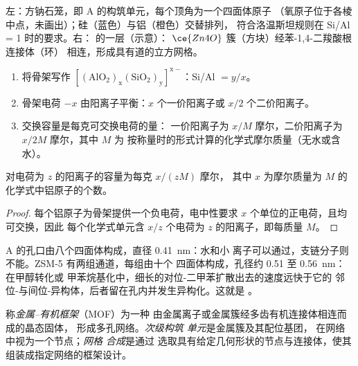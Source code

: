 \begin{omfigure}
{\small 左：方钠石笼，即 A 的构筑单元，每个顶角为一个四面体原子
（氧原子位于各棱中点，未画出）；硅（蓝色）与铝（橙色）交替排列，
符合洛温斯坦规则在 Si/Al = 1 时的要求。右：
的一层（示意）：
$\ce{Zn4O}$ 簇（方块）经苯-1,4-二羧酸根连接体（环）
相连，形成具有道的立方网格。}
\end{omfigure}

\begin{method}[沸石的化学式与交换容量]\label{met:b3:inorganic-materials:zeolite-formula}
\begin{enumerate}
  \item 将骨架写作 $\mathrm{[(AlO_2)_x(SiO_2)_y]^{x-}}$：Si/Al $= y/x$。
  \item 骨架电荷 $-x$ 由阳离子平衡：$x$ 个一价阳离子或 $x/2$
        个二价阳离子。
  \item 交换容量是每克可交换电荷的量：
        一价阳离子为 $x/M$ 摩尔，二价阳离子为 $x/2M$ 摩尔，其中 $M$ 为
        按称量时的形式计算的化学式摩尔质量（无水或含水）。
\end{enumerate}
\end{method}

\begin{proposition}[交换容量]\label{prop:b3:inorganic-materials:exchange-capacity}
对电荷为 $z$ 的阳离子的容量为每克 $x/(zM)$ 摩尔，
其中 $x$ 为摩尔质量为 $M$ 的化学式中铝原子的个数。
\end{proposition}

\begin{proof}
每个铝原子为骨架提供一个负电荷，电中性要求
$x$ 个单位的正电荷，且均可交换，因此
每个化学式单元含 $x/z$ 个电荷为 $z$ 的阳离子，即每质量 $M$。
\end{proof}

 A 的孔口由八个四面体构成，直径 \qty{0.41}{nm}：水和小
离子可以通过，支链分子则不能。ZSM-5 有两组通道，每组由十个
四面体构成，孔径约 0.51 至 \qty{0.56}{nm}：在甲醇转化或
甲苯烷基化中，细长的对位-二甲苯扩散出去的速度远快于它的
邻位-与间位-异构体，后者留在孔内并发生异构化。这就是
。

\begin{definition}[金属–有机框架]\label{def:b3:inorganic-materials:mof}
称\emph{金属–有机框架}（MOF）为一种
由金属离子或金属簇经多齿有机连接体相连而成的晶态固体，
形成多孔网络。\emph{次级构筑
单元}是金属簇及其配位基团，
在网络中视为一个节点；\emph{网格
合成}是通过
选取具有给定几何形状的节点与连接体，使其组装成指定网络的框架设计。
\end{definition}

